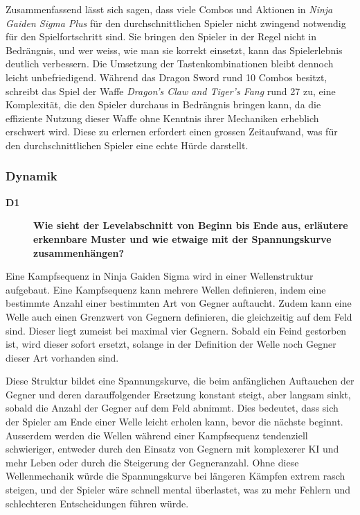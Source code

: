 \documentclass[../Main.tex]{subfiles}
\begin{document}
Zusammenfassend lässt sich sagen, dass viele Combos und Aktionen in \textit{Ninja Gaiden Sigma Plus} für den durchschnittlichen Spieler nicht zwingend notwendig für den Spielfortschritt sind. Sie bringen den Spieler in der Regel nicht in Bedrängnis, und wer weiss, wie man sie korrekt einsetzt, kann das Spielerlebnis deutlich verbessern. Die Umsetzung der Tastenkombinationen bleibt dennoch leicht unbefriedigend. Während das Dragon Sword rund 10 Combos besitzt, schreibt das Spiel der Waffe \textit{Dragon's Claw and Tiger's Fang} rund 27 zu, eine Komplexität, die den Spieler durchaus in Bedrängnis bringen kann, da die effiziente Nutzung dieser Waffe ohne Kenntnis ihrer Mechaniken erheblich erschwert wird. Diese zu erlernen erfordert einen grossen Zeitaufwand, was für den durchschnittlichen Spieler eine echte Hürde darstellt.


\subsubsection{Dynamik}

\begin{description}
  \item[\textbf{D1}] \textbf{Wie sieht der Levelabschnitt von Beginn bis Ende aus, erläutere erkennbare Muster und wie etwaige mit der Spannungskurve zusammenhängen?}
\end{description}

Eine Kampfsequenz in Ninja Gaiden Sigma wird in einer Wellenstruktur aufgebaut. Eine Kampfsequenz kann mehrere Wellen definieren, indem eine bestimmte Anzahl einer bestimmten Art von Gegner auftaucht. Zudem kann eine Welle auch einen Grenzwert von Gegnern definieren, die gleichzeitig auf dem Feld sind. Dieser liegt zumeist bei maximal vier Gegnern. Sobald ein Feind gestorben ist, wird dieser sofort ersetzt, solange in der Definition der Welle noch Gegner dieser Art vorhanden sind.

Diese Struktur bildet eine Spannungskurve, die beim anfänglichen Auftauchen der Gegner und deren darauffolgender Ersetzung konstant steigt, aber langsam sinkt, sobald die Anzahl der Gegner auf dem Feld abnimmt. Dies bedeutet, dass sich der Spieler am Ende einer Welle leicht erholen kann, bevor die nächste beginnt. Ausserdem werden die Wellen während einer Kampfsequenz tendenziell schwieriger, entweder durch den Einsatz von Gegnern mit komplexerer KI und mehr Leben oder durch die Steigerung der Gegneranzahl. Ohne diese Wellenmechanik würde die Spannungskurve bei längeren Kämpfen extrem rasch steigen, und der Spieler wäre schnell mental überlastet, was zu mehr Fehlern und schlechteren Entscheidungen führen würde.
\end{document}
